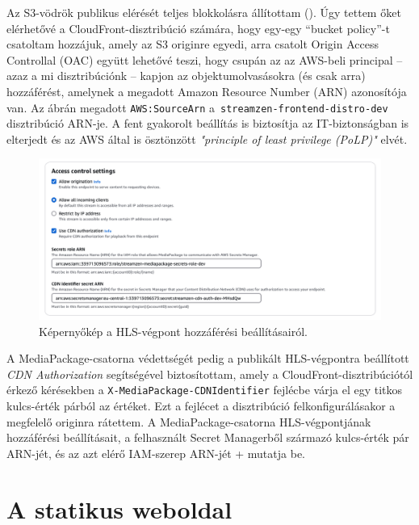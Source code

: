 Az S3-vödrök publikus elérését teljes blokkolásra állítottam (). Úgy tettem őket elérhetővé a CloudFront-disztribúció számára, hogy egy-egy ``bucket policy''-t csatoltam hozzájuk\cite{s3policy}, amely az S3 originre egyedi, arra csatolt Origin Access Controllal (OAC)\cite{oac} együtt lehetővé teszi, hogy csupán az az AWS-beli principal -- azaz a mi disztribúciónk -- kapjon az objektumolvasásokra (és csak arra) hozzáférést, amelynek a megadott Amazon Resource Number (ARN) azonosítója van. Az ábrán megadott \verb|AWS:SourceArn| a~\verb|streamzen-frontend-distro-dev| disztribúció ARN-je. A fent gyakorolt beállítás is biztosítja az IT-biztonságban is elterjedt és az AWS által is ösztönzött \emph{"principle of least privilege (PoLP)"} elvét.

\begin{figure}[h]
  \centering
  \includegraphics[width=150mm, keepaspectratio]{figures/distro_mediapack.png}
  \caption{Képernyőkép a HLS-végpont hozzáférési beállításairól.}
  \label{fig:mediapack}
\end{figure}

A MediaPackage-csatorna védettségét pedig a publikált HLS-végpontra beállított \emph{CDN Authorization}\cite{cdnauth} segítségével biztosítottam, amely a CloudFront-disztribúciótól érkező kérésekben a \verb|X-MediaPackage-CDNIdentifier| fejlécbe várja el egy titkos kulcs-érték párból az értéket. Ezt a fejlécet a disztribúció felkonfigurálásakor a megfelelő originra rátettem. A MediaPackage-csatorna HLS-végpontjának hozzáférési beállításait, a felhasznált Secret Managerből származó kulcs-érték pár ARN-jét, és az azt elérő IAM-szerep ARN-jét \az+ mutatja be.

\section{A statikus weboldal}

